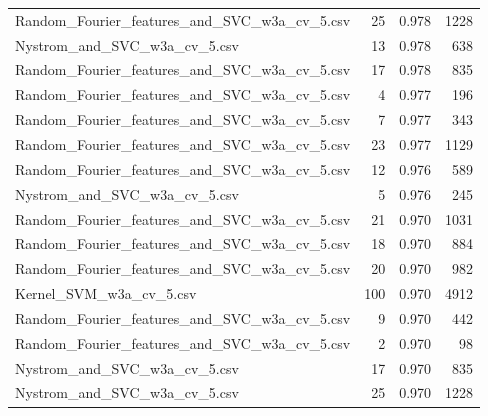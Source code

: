 \begin{tabularx}{\textwidth}{lrrr}
Random\_Fourier\_features\_and\_SVC\_w3a\_cv\_5.csv &       25 &               0.978 &          1228 \\
                Nystrom\_and\_SVC\_w3a\_cv\_5.csv &       13 &               0.978 &           638 \\
Random\_Fourier\_features\_and\_SVC\_w3a\_cv\_5.csv &       17 &               0.978 &           835 \\
Random\_Fourier\_features\_and\_SVC\_w3a\_cv\_5.csv &        4 &               0.977 &           196 \\
Random\_Fourier\_features\_and\_SVC\_w3a\_cv\_5.csv &        7 &               0.977 &           343 \\
Random\_Fourier\_features\_and\_SVC\_w3a\_cv\_5.csv &       23 &               0.977 &          1129 \\
Random\_Fourier\_features\_and\_SVC\_w3a\_cv\_5.csv &       12 &               0.976 &           589 \\
                Nystrom\_and\_SVC\_w3a\_cv\_5.csv &        5 &               0.976 &           245 \\
Random\_Fourier\_features\_and\_SVC\_w3a\_cv\_5.csv &       21 &               0.970 &          1031 \\
Random\_Fourier\_features\_and\_SVC\_w3a\_cv\_5.csv &       18 &               0.970 &           884 \\
Random\_Fourier\_features\_and\_SVC\_w3a\_cv\_5.csv &       20 &               0.970 &           982 \\
                     Kernel\_SVM\_w3a\_cv\_5.csv &      100 &               0.970 &          4912 \\
Random\_Fourier\_features\_and\_SVC\_w3a\_cv\_5.csv &        9 &               0.970 &           442 \\
Random\_Fourier\_features\_and\_SVC\_w3a\_cv\_5.csv &        2 &               0.970 &            98 \\
                Nystrom\_and\_SVC\_w3a\_cv\_5.csv &       17 &               0.970 &           835 \\
                Nystrom\_and\_SVC\_w3a\_cv\_5.csv &       25 &               0.970 &          1228 \\
\bottomrule
\end{tabularx}
